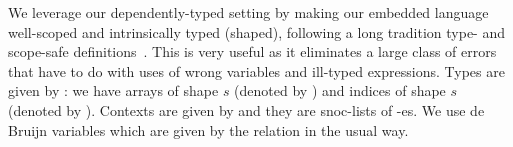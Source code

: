 We leverage our dependently-typed setting by making our
embedded language well-scoped and intrinsically typed (shaped),
following a long tradition type- and scope-safe definitions~\cite{intrinsic1,intrinsic2,intrinsic3}.
This is very useful as it eliminates a large class of errors that have to do
with uses of wrong variables and ill-typed expressions.
Types are given by : we have arrays of
shape $s$ (denoted by ) and indices of shape $s$
(denoted by ).  Contexts are given by  and they are
snoc-lists of -es.  We use de Bruijn variables which are given
by the relation  in the usual way. 
